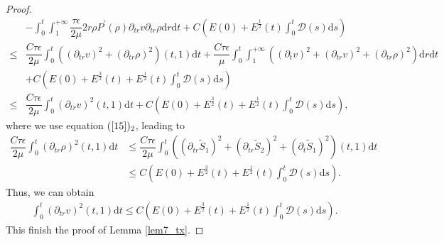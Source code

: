 \documentclass[10pt,reqno]{amsart}
\numberwithin{equation}{section}
\begin{document}
\begin{proof}
\begin{equation}
\begin{aligned}
				&-
				\int_{0}^{t}\int_{1}^{+\infty}\dfrac{\tau\epsilon}{2\mu}2r\rho P^{\prime}(\rho)\partial_{tr}v\partial_{tr}\rho \mathrm{d}r\mathrm{d}t
				+ C\left(E(0)+E^{\frac{1}{2}}(t) \int_{0}^{t}\mathcal{D}(s)\mathrm{d}s\right)
				\\
				\leq&\dfrac{C\tau\epsilon}{2\mu}\int_{0}^{t}\left((\partial_{tr}v)^2+(\partial_{tr}\rho)^2\right)(t,1) \mathrm{d}t
				+\dfrac{C\tau\epsilon}{\mu}\int_{0}^{t}\int_{1}^{+\infty}\left((\partial_{t}v)^2+(\partial_{tr}v)^2+(\partial_{tr}\rho)^2\right)
				\mathrm{d}r\mathrm{d}t
				\\
				&+ C\left(E(0)+E^{\frac{3}{2}}(t) +E^{\frac{1}{2}}(t) \int_{0}^{t}\mathcal{D}(s)\mathrm{d}s\right)\\
				\leq&\dfrac{C\tau\epsilon}{2\mu}\int_{0}^{t}(\partial_{tr}v)^2(t,1) \mathrm{d}t
				+ C\left(E(0)+E^{\frac{3}{2}}(t) +E^{\frac{1}{2}}(t) \int_{0}^{t}\mathcal{D}(s)\mathrm{d}s\right),
			\end{aligned}
		\end{equation}
		where we use equation $(\ref{15})_2$, leading to
		\begin{equation}\nonumber
			\begin{aligned}	
				\dfrac{C\tau\epsilon}{2\mu}\int_{0}^{t}(\partial_{tr}\rho)^2(t,1) \mathrm{d}t
				&\leq \dfrac{C\tau\epsilon}{2\mu}\int_{0}^{t}((\partial_{tr}\tilde{S}_1)^2+(\partial_{tr}\tilde{S}_2)^2+(\partial_{t}\tilde{S}_1)^2)(t,1)\mathrm{d}t\\
				&\leq C\left(E(0)+E^{\frac{3}{2}}(t) +E^{\frac{1}{2}}(t) \int_{0}^{t}\mathcal{D}(s)\mathrm{d}s\right).
			\end{aligned}
		\end{equation}
		Thus, we can obtain
		\begin{equation}\label{89}
			\begin{aligned}
				\int_{0}^{t}(\partial_{tr} v)^2(t,1)\mathrm{d}t
				\leq C\left(E(0)+E^{\frac{3}{2}}(t)+E^{\frac{1}{2}}(t) \int_{0}^{t}\mathcal{D}(s)\mathrm{d}s\right).
			\end{aligned}
		\end{equation}
	This finish the proof of Lemma \ref{lem7_tx}.
	\end{proof}                                                                                                                                                                                                       
\end{document}
